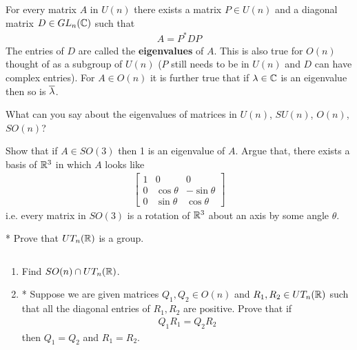 \begin{thm}
	For every matrix $A$ in $U(n)$ there exists a matrix $P \in U(n)$ and a diagonal matrix $D \in GL_n(\mathbb{C})$ such that
	\begin{align*}
		A = P^* D P
	\end{align*}
	The entries of $D$ are called the \textbf{eigenvalues} of $A$. This is also true for $O(n)$ thought of as a subgroup of $U(n)$ ($P$ still needs to be in $U(n)$ and $D$ can have complex entries). For $A \in O(n)$ it is further true that if $\lambda \in \mathbb{C}$ is an eigenvalue then so is $\overline{\lambda}$.
\end{thm}

\begin{question}
	What can you say about the eigenvalues of matrices in $U(n)$, $SU(n)$, $O(n)$, $SO(n)$?
\end{question}



\begin{question}
	\label{q:so3_rotations}
	Show that if $A \in SO(3)$ then 1 is an eigenvalue of $A$. Argue that, there exists a basis of $\mathbb{R}^3$ in which $A$ looks like
	\begin{align*}
		\begin{bmatrix}
			1 & 0 & 0 \\
			0 & \cos \theta & -\sin \theta \\
			0 & \sin \theta & \cos \theta
		\end{bmatrix}
	\end{align*}
	i.e. every matrix in $SO(3)$ is a rotation of $\mathbb{R}^3$ about an axis by some angle $\theta$.
\end{question}

\begin{question}*
  Prove that $UT_n(\mathbb{R})$ is a group.
\end{question}

\begin{question} \label{q:uniqueness_qr} $ $
  \begin{enumerate}
    \item
    Find $SO(n) \cap UT_n(\mathbb{R})$.
    \item* Suppose we are given matrices $Q_1, Q_2 \in O(n)$ and $R_1, R_2 \in UT_n(\mathbb{R})$ such that all the diagonal entries of $R_1, R_2$ are positive. Prove that if
    \begin{align*}
      Q_1 R_1 = Q_2 R_2
    \end{align*}
    then $Q_1 = Q_2$ and $R_1 = R_2$.
  \end{enumerate}
\end{question}

